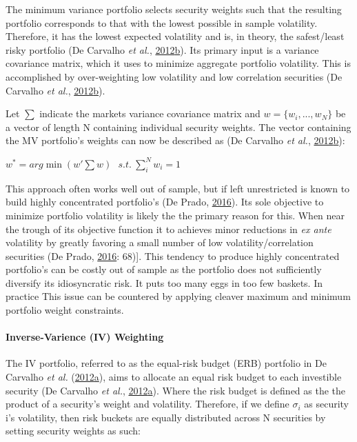 \documentclass[11pt,preprint, authoryear]{elsarticle}
\numberwithin{equation}{section}
\numberwithin{figure}{section}
\numberwithin{table}{section}
\begin{document}
The minimum variance portfolio selects security weights such that the
resulting portfolio corresponds to that with the lowest possible in
sample volatility. Therefore, it has the lowest expected volatility and
is, in theory, the safest/least risky portfolio (De Carvalho \emph{et
al.},
\protect\hyperlink{ref-rawl2012}{2012}\protect\hyperlink{ref-rawl2012}{b}).
Its primary input is a variance covariance matrix, which it uses to
minimize aggregate portfolio volatility. This is accomplished by
over-weighting low volatility and low correlation securities (De
Carvalho \emph{et al.},
\protect\hyperlink{ref-rawl2012}{2012}\protect\hyperlink{ref-rawl2012}{b}).

Let \(\sum\) indicate the markets variance covariance matrix and
\(w=\{w_i,..., w_N \}\) be a vector of length N containing individual
security weights. The vector containing the MV portfolio's weights can
now be described as (De Carvalho \emph{et al.},
\protect\hyperlink{ref-rawl2012}{2012}\protect\hyperlink{ref-rawl2012}{b}):

\begin{center}
$w^*=arg\min(w'\sum w)\ \ \ s.t.\ \sum^N_iw_i=1$ 
\end{center}

This approach often works well out of sample, but if left unrestricted
is known to build highly concentrated portfolio's (De Prado,
\protect\hyperlink{ref-lopez}{2016}). Its sole objective to minimize
portfolio volatility is likely the the primary reason for this. When
near the trough of its objective function it to achieves minor
reductions in \emph{ex ante} volatility by greatly favoring a small
number of low volatility/correlation securities (De Prado,
\protect\hyperlink{ref-lopez}{2016}: 68){]}. This tendency to produce
highly concentrated portfolio's can be costly out of sample as the
portfolio does not sufficiently diversify its idiosyncratic risk. It
puts too many eggs in too few baskets. In practice This issue can be
countered by applying cleaver maximum and minimum portfolio weight
constraints.

\hypertarget{inverse-varience-iv-weighting}{%
\paragraph{Inverse-Varience (IV)
Weighting}\label{inverse-varience-iv-weighting}}

The IV portfolio, referred to as the equal-risk budget (ERB) portfolio
in De Carvalho \emph{et al.}
(\protect\hyperlink{ref-leote}{2012}\protect\hyperlink{ref-leote}{a}),
aims to allocate an equal risk budget to each investible security (De
Carvalho \emph{et al.},
\protect\hyperlink{ref-leote}{2012}\protect\hyperlink{ref-leote}{a}).
Where the risk budget is defined as the the product of a security's
weight and volatility. Therefore, if we define \(\sigma_i\) as security
i's volatility, then risk buckets are equally distributed across N
securities by setting security weights as such:
\end{document}
